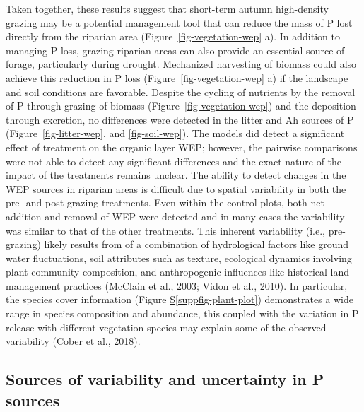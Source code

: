 \documentclass[
]{agujournal2019}
\newcommand*\quartosuppfigref[1]{Figure \hyperref[#1]{S\ref{#1}}}
\begin{document}
Taken together, these results suggest that short-term autumn
high-density grazing may be a potential management tool that can reduce
the mass of P lost directly from the riparian area
(Figure~\ref{fig-vegetation-wep} a). In addition to managing P loss,
grazing riparian areas can also provide an essential source of forage,
particularly during drought. Mechanized harvesting of biomass could also
achieve this reduction in P loss (Figure~\ref{fig-vegetation-wep} a) if
the landscape and soil conditions are favorable. Despite the cycling of
nutrients by the removal of P through grazing of biomass
(Figure~\ref{fig-vegetation-wep}) and the deposition through excretion,
no differences were detected in the litter and Ah sources of P
(Figure~\ref{fig-litter-wep}, and \ref{fig-soil-wep}). The models did
detect a significant effect of treatment on the organic layer WEP;
however, the pairwise comparisons were not able to detect any
significant differences and the exact nature of the impact of the
treatments remains unclear. The ability to detect changes in the WEP
sources in riparian areas is difficult due to spatial variability in
both the pre- and post-grazing treatments. Even within the control
plots, both net addition and removal of WEP were detected and in many
cases the variability was similar to that of the other treatments. This
inherent variability (i.e., pre-grazing) likely results from of a
combination of hydrological factors like ground water fluctuations, soil
attributes such as texture, ecological dynamics involving plant
community composition, and anthropogenic influences like historical land
management practices (McClain et al., 2003; Vidon et al., 2010). In
particular, the species cover information
(\quartosuppfigref{suppfig-plant-plot}) demonstrates a wide range in
species composition and abundance, this coupled with the variation in P
release with different vegetation species may explain some of the
observed variability (Cober et al., 2018).

\subsection{Sources of variability and uncertainty in P
sources}\label{sources-of-variability-and-uncertainty-in-p-sources}
\end{document}

